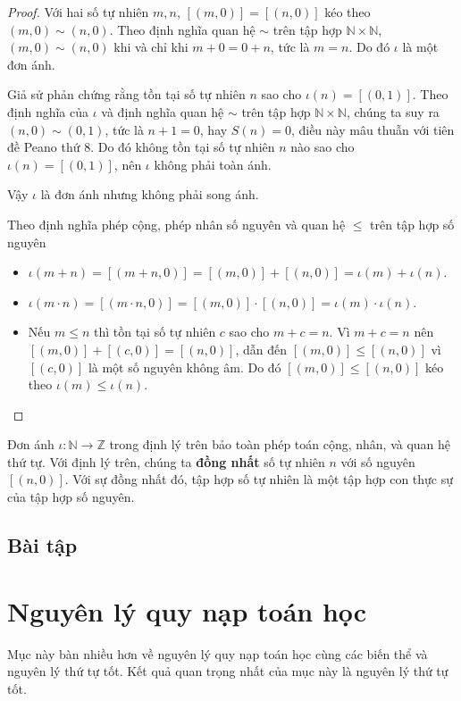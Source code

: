 \begin{proof}
    Với hai số tự nhiên $m, n$, $[(m, 0)] = [(n, 0)]$ kéo theo $(m, 0)\sim (n, 0)$. Theo định nghĩa quan hệ $\sim$ trên tập hợp $\mathbb{N}\times\mathbb{N}$, $(m, 0)\sim (n, 0)$ khi và chỉ khi $m + 0 = 0 + n$, tức là $m = n$. Do đó $\iota$ là một đơn ánh.

    Giả sử phản chứng rằng tồn tại số tự nhiên $n$ sao cho $\iota(n) = [(0, 1)]$. Theo định nghĩa của $\iota$ và định nghĩa quan hệ $\sim$ trên tập hợp $\mathbb{N}\times\mathbb{N}$, chúng ta suy ra $(n, 0)\sim (0, 1)$, tức là $n + 1 = 0$, hay $S(n) = 0$, điều này mâu thuẫn với tiên đề Peano thứ 8. Do đó không tồn tại số tự nhiên $n$ nào sao cho $\iota(n) = [(0, 1)]$, nên $\iota$ không phải toàn ánh.

    Vậy $\iota$ là đơn ánh nhưng không phải song ánh.

    Theo định nghĩa phép cộng, phép nhân số nguyên và quan hệ $\leq$ trên tập hợp số nguyên
    \begin{itemize}
        \item $\iota(m + n) = [(m + n, 0)] = [(m, 0)] + [(n, 0)] = \iota(m) + \iota(n)$.
        \item $\iota(m\cdot n) = [(m\cdot n, 0)] = [(m, 0)]\cdot [(n, 0)] = \iota(m)\cdot\iota(n)$.
        \item Nếu $m\leq n$ thì tồn tại số tự nhiên $c$ sao cho $m + c = n$. Vì $m + c = n$ nên $[(m, 0)] + [(c, 0)]= [(n, 0)]$, dẫn đến $[(m, 0)]\leq [(n, 0)]$ vì $[(c, 0)]$ là một số nguyên không âm. Do đó $[(m, 0)]\leq [(n, 0)]$ kéo theo $\iota(m)\leq\iota(n)$.
    \end{itemize}
\end{proof}

Đơn ánh $\iota: \mathbb{N}\to \mathbb{Z}$ trong định lý trên bảo toàn phép toán cộng, nhân, và quan hệ thứ tự. Với định lý trên, chúng ta \textbf{đồng nhất} số tự nhiên $n$ với số nguyên $[(n, 0)]$. Với sự đồng nhất đó, tập hợp số tự nhiên là một tập hợp con thực sự của tập hợp số nguyên.

\subsection{Bài tập}

\section{Nguyên lý quy nạp toán học}

Mục này bàn nhiều hơn về nguyên lý quy nạp toán học cùng các biến thể và nguyên lý thứ tự tốt. Kết quả quan trọng nhất của mục này là nguyên lý thứ tự tốt.

